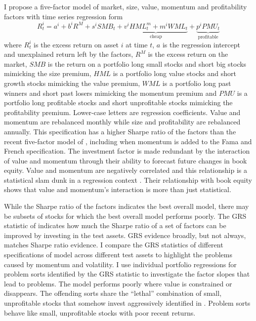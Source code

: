 I propose a five-factor model of market, size, value, momentum and
profitability factors with time series regression form
\begin{equation} \label{eq:B16}
R_t^i = a^i+b^iR^M+s^iSMB_t+
\underbrace{v^iHML_t^m+m^iWML_t}_\text{cheap}+
\underbrace{p^iPMU_t}_\text{profitable}
\end{equation}
where $R_t^i$ is the excess return on asset $i$ at time $t$, $a$ is the
regression intercept and unexplained return left by the factors, $R^M$ is the
excess return on the market, $SMB$ is the return on a portfolio long small
stocks and short big stocks mimicking the size premium, $HML$ is a portfolio
long value stocks and short growth stocks mimicking the value premium, $WML$ is
a portfolio long past winners and short past losers mimicking the momentum
premium and $PMU$ is a portfolio long profitable stocks and short unprofitable
stocks mimicking the profitability premium.
Lower-case letters are regression coefficients.
Value and momentum are rebalanced monthly while size and profitability are
rebalanced annually.
This specification has a higher Sharpe ratio of the factors than the recent
five-factor model of \textcite{fama2015five}, including when momentum is added
to the Fama and French specification.
The investment factor is made redundant by the interaction of value and
momentum through their ability to forecast future changes in book equity.
Value and momentum are negatively correlated and this relationship is a
statistical slam dunk in a regression context
\parencite{asness1997interaction, fama2015incremental}.
Their relationship with book equity shows that value and momentum's interaction
is more than just statistical.

While the Sharpe ratio of the factors indicates the best overall model, there
may be subsets of stocks for which the best overall model performs poorly.
The GRS statistic of \textcite{gibbons1989test} indicates how much the Sharpe
ratio of a set of factors can be improved by investing in the test assets.
GRS evidence broadly, but not always, matches Sharpe ratio evidence.
I compare the GRS statistics of different specifications of model across
different test assets to highlight the problems caused by momentum and
volatility.
I use individual portfolio regressions for problem sorts identified by the GRS
statistic to investigate the factor slopes that lead to problems.
The model performs poorly where value is constrained or disappears.
The offending sorts share the ``lethal” combination of small, unprofitable
stocks that somehow invest aggressively identified in
\textcite{fama2015five, fama2016dissecting}.
Problem sorts behave like small, unprofitable stocks with poor recent returns.

